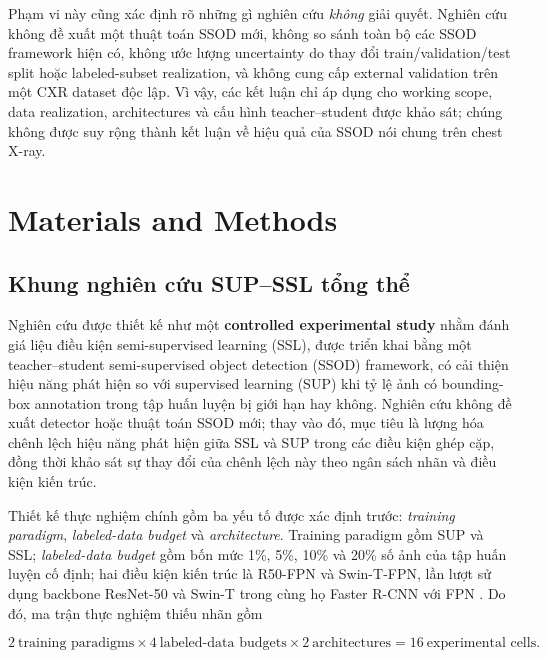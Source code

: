 \documentclass[pdflatex,sn-mathphys-num]{sn-jnl}%
\theoremstyle{thmstyleone}%
\theoremstyle{thmstyletwo}%
\theoremstyle{thmstylethree}%
\begin{document}
Phạm vi này cũng xác định rõ những gì nghiên cứu \emph{không} giải quyết.
Nghiên cứu không đề xuất một thuật toán SSOD mới, không so sánh toàn bộ các
SSOD framework hiện có, không ước lượng uncertainty do thay đổi
train/validation/test split hoặc labeled-subset realization, và không cung cấp
external validation trên một CXR dataset độc lập. Vì vậy, các kết luận chỉ áp
dụng cho working scope, data realization, architectures và cấu hình
teacher--student được khảo sát; chúng không được suy rộng thành kết luận về
hiệu quả của SSOD nói chung trên chest X-ray.

\section{Materials and Methods}\label{sec:methods}

\subsection{Khung nghiên cứu SUP--SSL tổng thể}
\label{subsec:overall_research_framework}

Nghiên cứu được thiết kế như một \textbf{controlled experimental study}
nhằm đánh giá liệu điều kiện semi-supervised learning (SSL), được triển khai
bằng một teacher--student semi-supervised object detection (SSOD) framework,
có cải thiện hiệu năng phát hiện so với supervised learning (SUP) khi tỷ lệ
ảnh có bounding-box annotation trong tập huấn luyện bị giới hạn hay không.
Nghiên cứu không đề xuất detector hoặc thuật toán SSOD mới; thay vào đó,
mục tiêu là lượng hóa chênh lệch hiệu năng phát hiện giữa SSL và SUP
trong các điều kiện ghép cặp, đồng thời khảo sát
sự thay đổi của chênh lệch này theo ngân sách nhãn và điều kiện kiến trúc.

Thiết kế thực nghiệm chính gồm ba yếu tố được xác định trước:
\textit{training paradigm}, \textit{labeled-data budget} và
\textit{architecture}. Training paradigm gồm SUP và SSL;
\textit{labeled-data budget} gồm bốn mức 1\%, 5\%, 10\% và 20\% số ảnh
của tập huấn luyện cố định; hai điều kiện kiến trúc là R50-FPN và
Swin-T-FPN, lần lượt sử dụng backbone ResNet-50 và Swin-T trong cùng họ
Faster R-CNN với FPN \cite{liu2021swin}. Do đó, ma trận thực nghiệm thiếu
nhãn gồm

\begin{equation}
2\ \text{training paradigms}
\times
4\ \text{labeled-data budgets}
\times
2\ \text{architectures}
=
16\ \text{experimental cells}.
\label{eq:experimental_matrix_16_cells}
\end{equation}
\end{document}

